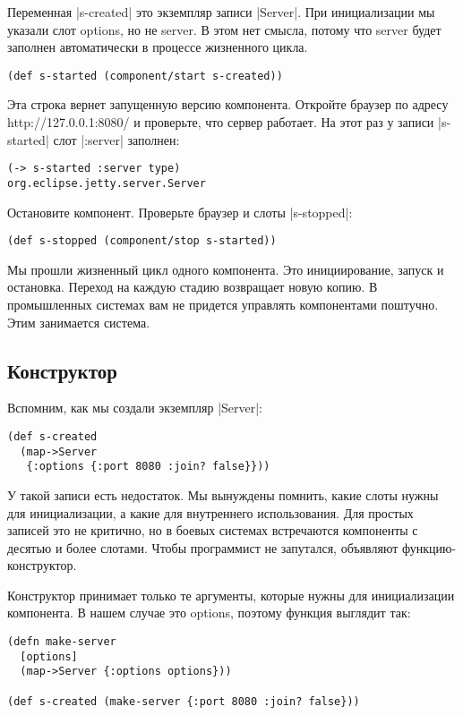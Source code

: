 Переменная \spverb|s-created| это экземпляр записи \spverb|Server|. При инициализации мы
указали слот options, но не server. В этом нет смысла, потому что server будет
заполнен автоматически в процессе жизненного цикла.

\begin{verbatim}
(def s-started (component/start s-created))
\end{verbatim}

Эта строка вернет запущенную версию компонента. Откройте браузер по адресу
http://127.0.0.1:8080/ и проверьте, что сервер работает. На этот раз у записи
\spverb|s-started| слот \spverb|:server| заполнен:

\begin{verbatim}
(-> s-started :server type)
org.eclipse.jetty.server.Server
\end{verbatim}

Остановите компонент. Проверьте браузер и слоты \spverb|s-stopped|:

\begin{verbatim}
(def s-stopped (component/stop s-started))
\end{verbatim}

Мы прошли жизненный цикл одного компонента. Это инициирование, запуск и
остановка. Переход на каждую стадию возвращает новую копию. В промышленных
системах вам не придется управлять компонентами поштучно. Этим занимается
система.

\subsection{Конструктор}

Вспомним, как мы создали экземпляр \spverb|Server|:

\begin{verbatim}
(def s-created
  (map->Server
   {:options {:port 8080 :join? false}}))
\end{verbatim}

У такой записи есть недостаток. Мы вынуждены помнить, какие слоты нужны для
инициализации, а какие для внутреннего использования. Для простых записей это не
критично, но в боевых системах встречаются компоненты с десятью и более
слотами. Чтобы программист не запутался, объявляют функцию-конструктор.

Конструктор принимает только те аргументы, которые нужны для инициализации
компонента. В нашем случае это options, поэтому функция выглядит так:

\begin{verbatim}
(defn make-server
  [options]
  (map->Server {:options options}))

(def s-created (make-server {:port 8080 :join? false}))
\end{verbatim}

